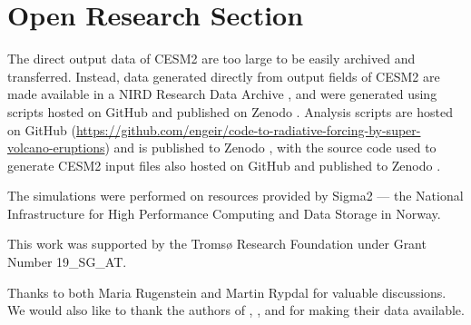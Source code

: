 \documentclass[draft]{agujournal2019}
\begin{document}
  \section*{Open Research Section}


  The direct output data of CESM2 are too large to be easily archived and transferred.
  Instead, data generated directly from output fields of CESM2 are made available in a
  NIRD Research Data Archive \cite{enger2024:nirddataarchive}, and were generated using
  scripts hosted on GitHub and published on Zenodo \cite{enger2024:data-aggregate}.
  Analysis scripts are hosted on GitHub (\url{https://github.com/engeir/code-to-radiative-forcing-by-super-volcano-eruptions})
  and is published to Zenodo \cite{enger2024:code4paper1}, with the source code used to
  generate CESM2 input files also hosted on GitHub and published to Zenodo
  \cite{enger2024:volcano-setup}.

  \acknowledgments

  The simulations were performed on resources provided by Sigma2 --- the National
  Infrastructure for High Performance Computing and Data Storage in Norway.

  This work was supported by the Tromsø Research Foundation under Grant Number
  19\_SG\_AT.

  Thanks to both Maria Rugenstein and Martin Rypdal for valuable discussions. We would
  also like to thank the authors of , , and
   for making their data available.

  
\end{document}
